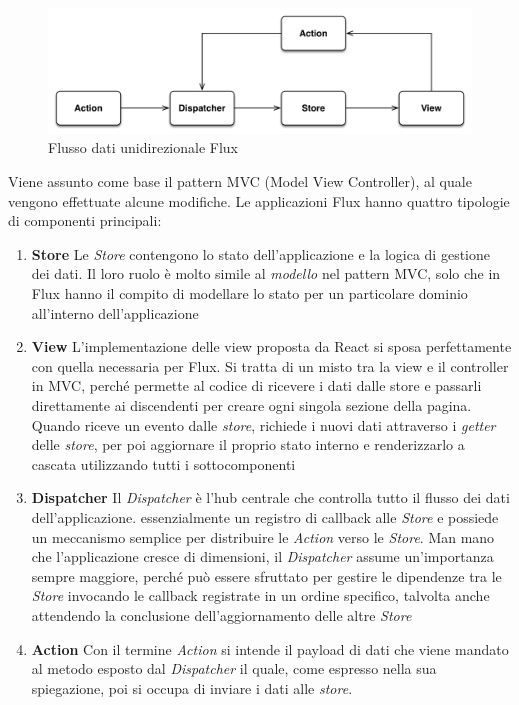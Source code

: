 \begin{figure}[ht]
	\centering
	\includegraphics[width=\textwidth]{6-implementazione-app/immagini/flux.png}
	\caption{Flusso dati unidirezionale Flux}\label{fig:flux}
\end{figure}
Viene assunto come base il pattern MVC (Model View Controller), al quale vengono effettuate alcune modifiche.
Le applicazioni Flux hanno quattro tipologie di componenti principali: 
\begin{enumerate}
	\item \textbf{Store}
	Le \emph{Store} contengono lo stato dell'applicazione e la logica di gestione dei dati. Il loro ruolo è molto simile al \emph{modello} nel pattern MVC, solo che in Flux hanno il compito di modellare lo stato per un particolare dominio all'interno dell'applicazione
	\item \textbf{View}
	L'implementazione delle view proposta da React si sposa perfettamente con quella necessaria per Flux. Si tratta di un misto tra la view e il controller in MVC, perché permette al codice di ricevere i dati dalle store e passarli direttamente ai discendenti per creare ogni singola sezione della pagina. Quando riceve un evento dalle \emph{store}, richiede i nuovi dati attraverso i \emph{getter} delle \emph{store}, per poi aggiornare il proprio stato interno e renderizzarlo a cascata utilizzando tutti i sottocomponenti
	\item \textbf{Dispatcher}
	Il \emph{Dispatcher} è l'hub centrale che controlla tutto il flusso dei dati dell'applicazione. \upe essenzialmente un registro di callback alle \emph{Store} e possiede un meccanismo semplice per distribuire le \emph{Action} verso le \emph{Store}. Man mano che l'applicazione cresce di dimensioni, il \emph{Dispatcher} assume un'importanza sempre maggiore, perché può essere sfruttato per gestire le dipendenze tra le \emph{Store} invocando le callback registrate in un ordine specifico, talvolta anche attendendo la conclusione dell'aggiornamento delle altre \emph{Store} 
	\item \textbf{Action} Con il termine \emph{Action} si intende il payload di dati che viene mandato al metodo esposto dal \emph{Dispatcher} il quale, come espresso nella sua spiegazione, poi si occupa di inviare i dati alle \emph{store}.
\end{enumerate} 

